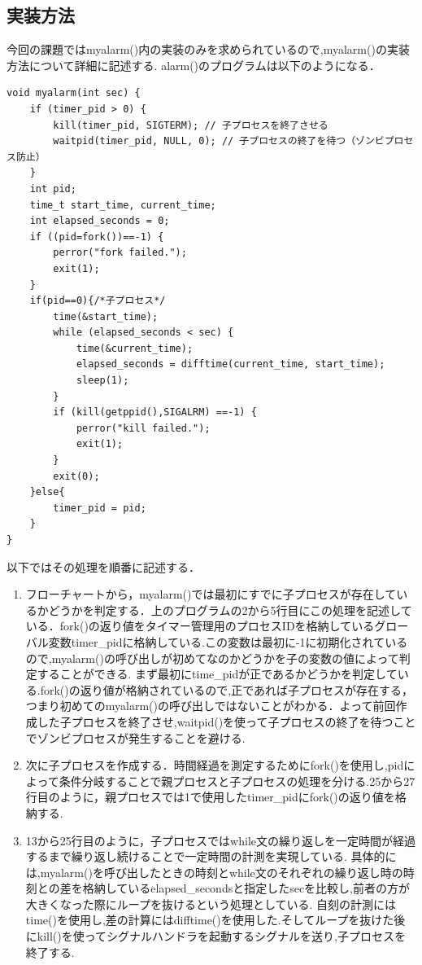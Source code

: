 \documentclass[dvipdfmx]{jarticle}
\begin{document}
\subsection{実装方法}
今回の課題ではmyalarm()内の実装のみを求められているので,myalarm()の実装方法について詳細に記述する.
alarm()のプログラムは以下のようになる．
\begin{lstlisting}
void myalarm(int sec) {
    if (timer_pid > 0) {
        kill(timer_pid, SIGTERM); // 子プロセスを終了させる
        waitpid(timer_pid, NULL, 0); // 子プロセスの終了を待つ（ゾンビプロセス防止）
    }
    int pid;
    time_t start_time, current_time;
    int elapsed_seconds = 0;
    if ((pid=fork())==-1) {
        perror("fork failed.");
        exit(1);
    }
    if(pid==0){/*子プロセス*/
        time(&start_time);
        while (elapsed_seconds < sec) {
            time(&current_time);
            elapsed_seconds = difftime(current_time, start_time);
            sleep(1);
        }
        if (kill(getppid(),SIGALRM) ==-1) {
            perror("kill failed.");
            exit(1);
        }
        exit(0);
    }else{
        timer_pid = pid;
    }
}
\end{lstlisting}
以下ではその処理を順番に記述する．
\begin{enumerate}
    \item フローチャートから，myalarm()では最初にすでに子プロセスが存在しているかどうかを判定する．上のプログラムの2から5行目にこの処理を記述している．fork()の返り値をタイマー管理用のプロセスIDを格納しているグローバル変数timer\_pidに格納している.この変数は最初に-1に初期化されているので,myalarm()の呼び出しが初めてなのかどうかを子の変数の値によって判定することができる.
    まず最初にtime\_pidが正であるかどうかを判定している.fork()の返り値が格納されているので,正であれば子プロセスが存在する，つまり初めてのmyalarm()の呼び出しではないことがわかる．よって前回作成した子プロセスを終了させ,waitpid()を使って子プロセスの終了を待つことでゾンビプロセスが発生することを避ける.
    \item 次に子プロセスを作成する．時間経過を測定するためにfork()を使用し,pidによって条件分岐することで親プロセスと子プロセスの処理を分ける.25から27行目のように，親プロセスでは1で使用したtimer\_pidにfork()の返り値を格納する.
    \item 13から25行目のように，子プロセスではwhile文の繰り返しを一定時間が経過するまで繰り返し続けることで一定時間の計測を実現している.
    具体的には,myalarm()を呼び出したときの時刻とwhile文のそれぞれの繰り返し時の時刻との差を格納しているelapsed\_secondsと指定したsecを比較し,前者の方が大きくなった際にループを抜けるという処理としている.
    自刻の計測にはtime()を使用し,差の計算にはdifftime()を使用した.そしてループを抜けた後にkill()を使ってシグナルハンドラを起動するシグナルを送り,子プロセスを終了する.
\end{enumerate}
\end{document}
